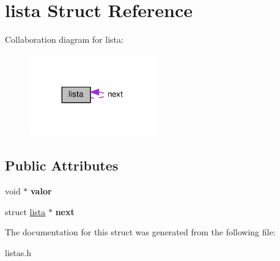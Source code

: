\hypertarget{structlista}{}\section{lista Struct Reference}
\label{structlista}


Collaboration diagram for lista\+:
\nopagebreak
\begin{figure}[H]
\begin{center}
\leavevmode
\includegraphics[width=155pt]{structlista__coll__graph}
\end{center}
\end{figure}
\subsection*{Public Attributes}
\begin{DoxyCompactItemize}
\item 
\mbox{\label{structlista_a1851230b0237deef0519ee33de9f2dd0}} 
void $\ast$ {\bfseries valor}
\item 
\mbox{\label{structlista_a03e6d0ed2ba4b439580ef0dcdb0b20c4}} 
struct \hyperlink{structlista}{lista} $\ast$ {\bfseries next}
\end{DoxyCompactItemize}


The documentation for this struct was generated from the following file\+:\begin{DoxyCompactItemize}
\item 
listas.\+h\end{DoxyCompactItemize}
